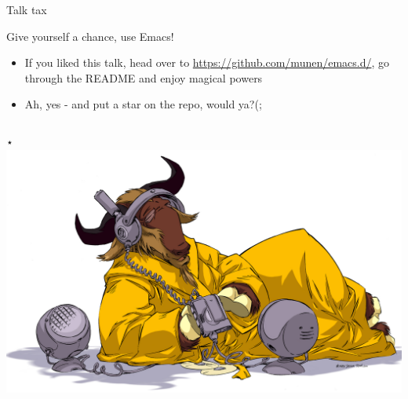\documentclass[bigger]{beamer}
\begin{document}
\begin{frame}[label={sec:org2de4fed}]{Talk tax}
\begin{block}{Give yourself a chance, use Emacs!}
\begin{itemize}
\item If you liked this talk, head over to
\url{https://github.com/munen/emacs.d/}, go through the README and enjoy
magical powers
\item Ah, yes - and put a star on the repo, would ya?(;
\end{itemize}
\end{block}

\begin{columns}
\begin{column}{0.45\columnwidth}
\begin{block}{⋆}
\includegraphics[height=0.35\textheight]{images/gnu_listen_half.jpg}
\end{block}
\end{column}



\end{columns}
\end{frame}
\end{document}
